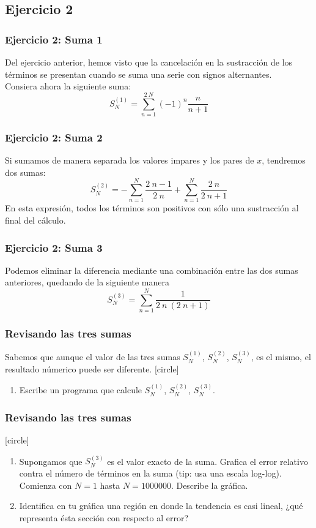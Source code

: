 \subsection{Ejercicio 2}
\begin{frame}
\frametitle{Ejercicio 2: Suma 1}
Del ejercicio anterior, hemos visto que la cancelación en la sustracción de los términos se presentan cuando se suma una serie con signos alternantes.
\\
\bigskip
\pause
Consiera ahora la siguiente suma:
\begin{equation}
S^{(1)}_{N}= \sum^{2 \: N}_{n=1} (-1)^{n} \dfrac{n}{n + 1}
\label{eq:ecuacion_02_10}
\end{equation}
\end{frame}
\begin{frame}
\frametitle{Ejercicio 2: Suma 2}
Si sumamos de manera separada los valores impares y los pares de $x$, tendremos dos sumas:
\begin{equation}
S^{(2)}_{N}= - \sum^{N}_{n = 1} \dfrac{2 \: n-1}{2 \: n} + \sum^{N}_{n = 1} \dfrac{2 \: n}{2 \: n + 1}
\label{eq:ecuacion_02_11}
\end{equation}
En esta expresión, todos los términos son positivos con sólo una sustracción al final del cálculo.
\end{frame}
\begin{frame}
\frametitle{Ejercicio 2: Suma 3}
Podemos eliminar la diferencia mediante una combinación entre las dos sumas anteriores, quedando de la siguiente manera
\begin{equation}
S^{(3)}_{N}=  \sum^{N}_{n = 1} \dfrac{1}{2 \: n \: (2 \: n + 1)}
\label{eq:ecuacion_02_12}
\end{equation}
\end{frame}
\begin{frame}
\frametitle{Revisando las tres sumas}
Sabemos que aunque el valor de las tres sumas $S^{(1)}_{N}$, $S^{(2)}_{N}$, $S^{(3)}_{N}$, es el mismo, el resultado númerico puede ser diferente.
[circle]
\begin{enumerate}[<+->]
\item Escribe un programa que calcule $S^{(1)}_{N}$, $S^{(2)}_{N}$, $S^{(3)}_{N}$.
\seti
\end{enumerate}
\end{frame}
\begin{frame}
\frametitle{Revisando las tres sumas}
[circle]
\begin{enumerate}[<+->]
\conti
\item Supongamos que $S^{(3)}_{N}$ es el valor exacto de la suma. Grafica el error relativo contra el número de términos en la suma (tip: usa una escala log-log). Comienza con $N = 1$ hasta $N = 1000000$. Describe la gráfica.
\item Identifica en tu gráfica una región en donde la tendencia es casi lineal, ¿qué representa ésta sección con respecto al error?
\end{enumerate}
\end{frame}
